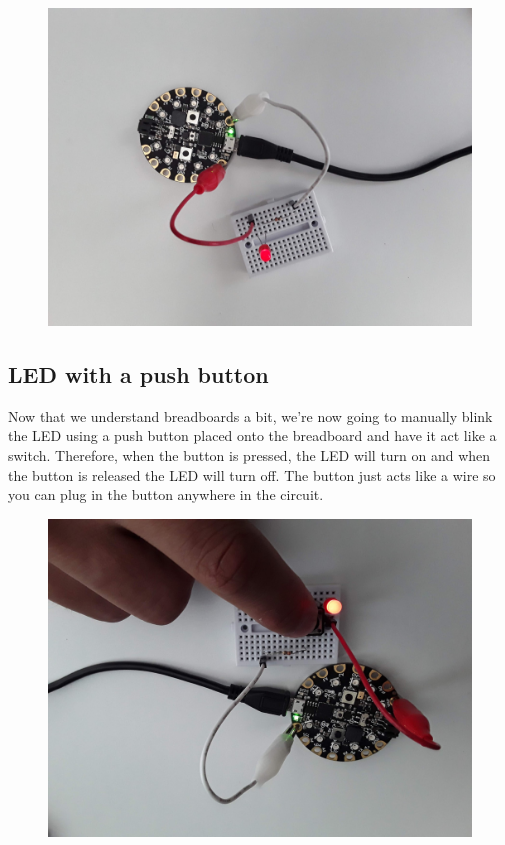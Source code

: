 \begin{figure}[H]
  \begin{center}
    \includegraphics[width=\textwidth]{Figures/LED2.jpeg}
  \end{center}
\end{figure}
\subsection{LED with a push button}

Now that we understand breadboards a bit, we’re now going to manually
blink the LED using a push button placed 
onto the breadboard and have it act like a switch. Therefore, when the
button is pressed, the LED will turn on and when the button is
released the LED will turn off. The button just acts like a wire so
you can plug in the button anywhere in the circuit.
\begin{figure}[H]
  \begin{center}
    \includegraphics[width=\textwidth]{Figures/LED3.jpeg}
  \end{center}
\end{figure}

